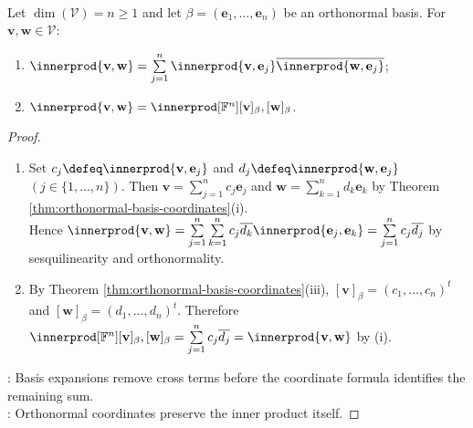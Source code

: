 \begin{theorem} \label{thm:parseval-identity-finite-dimensional} \\
Let $\dim(\mathcal{V})=n\geq1$ and let $\beta=(\mathbf{e}_1,\ldots,\mathbf{e}_n)$ be an orthonormal basis. For $\mathbf{v},\mathbf{w}\in\mathcal{V}$:
\begin{enumerate}[label=(\roman*)]
\setlength{\itemsep}{0pt}
\item $\innerprod{\mathbf{v},\mathbf{w}}=\sum\limits_{j=1}^{n}\innerprod{\mathbf{v},\mathbf{e}_j}\overline{\innerprod{\mathbf{w},\mathbf{e}_j}}$;
\item $\innerprod{\mathbf{v},\mathbf{w}}=\innerprod[\mathbb{F}^n]{[\mathbf{v}]_{\beta},[\mathbf{w}]_{\beta}}$.
\end{enumerate}
\begin{proof}
\begin{enumerate}[label=(\roman*)]
\setlength{\itemsep}{0pt}
\item Set $c_j\defeq\innerprod{\mathbf{v},\mathbf{e}_j}$ and $d_j\defeq\innerprod{\mathbf{w},\mathbf{e}_j}$ $(j\in\{1,\ldots,n\})$. Then $\mathbf{v}=\sum\limits_{j=1}^{n}c_j\mathbf{e}_j$ and $\mathbf{w}=\sum\limits_{k=1}^{n}d_k\mathbf{e}_k$ by Theorem \ref{thm:orthonormal-basis-coordinates}(i).\\
Hence $\innerprod{\mathbf{v},\mathbf{w}}=\sum\limits_{j=1}^{n}\sum\limits_{k=1}^{n}c_j\overline{d_k}\innerprod{\mathbf{e}_j,\mathbf{e}_k}=\sum\limits_{j=1}^{n}c_j\overline{d_j}$ by sesquilinearity and orthonormality.
\item By Theorem \ref{thm:orthonormal-basis-coordinates}(iii), $[\mathbf{v}]_{\beta}=(c_1,\ldots,c_n)^t$ and $[\mathbf{w}]_{\beta}=(d_1,\ldots,d_n)^t$. Therefore $\innerprod[\mathbb{F}^n]{[\mathbf{v}]_{\beta},[\mathbf{w}]_{\beta}}=\sum\limits_{j=1}^{n}c_j\overline{d_j}=\innerprod{\mathbf{v},\mathbf{w}}$ by (i).
\end{enumerate}
: Basis expansions remove cross terms before the coordinate formula identifies the remaining sum.\\
: Orthonormal coordinates preserve the inner product itself.
\end{proof}
\end{theorem}


